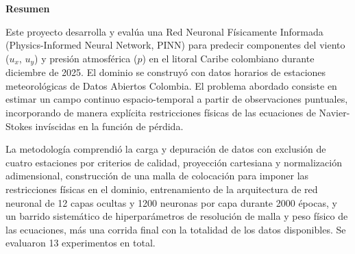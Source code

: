 \begin{flushleft} %
\begin{center}
\textbf{Resumen}
\end{center}
\vspace{0.8\baselineskip}



Este proyecto desarrolla y evalúa una Red Neuronal Físicamente Informada (Physics-Informed Neural Network, PINN) para predecir componentes del viento ($u_x$, $u_y$) y presión atmosférica ($p$) en el litoral Caribe colombiano durante diciembre de 2025. El dominio se construyó con datos horarios de estaciones meteorológicas de Datos Abiertos Colombia. El problema abordado consiste en estimar un campo continuo espacio-temporal a partir de observaciones puntuales, incorporando de manera explícita restricciones físicas de las ecuaciones de Navier-Stokes invíscidas en la función de pérdida.
\vspace{0.5em}

La metodología comprendió la carga y depuración de datos con exclusión de cuatro estaciones por criterios de calidad, proyección cartesiana y normalización adimensional, construcción de una malla de colocación para imponer las restricciones físicas en el dominio, entrenamiento de la arquitectura de red neuronal de 12 capas ocultas y 1200 neuronas por capa durante 2000 épocas, y un barrido sistemático de hiperparámetros de resolución de malla y peso físico de las ecuaciones, más una corrida final con la totalidad de los datos disponibles. Se evaluaron 13 experimentos en total.


\end{flushleft}
